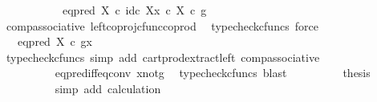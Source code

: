 \begin{isabellebody}
\ \ \ \ \ \ \ \ \ \ {\isacharequal}{\kern0pt}\ {\isacharparenleft}{\kern0pt}eq{\isacharunderscore}{\kern0pt}pred\ X\ {\isasymcirc}\isactrlsub c\ {\isasymlangle}id\isactrlsub c\ X{\isacharcomma}{\kern0pt}x\ {\isasymcirc}\isactrlsub c\ {\isasymbeta}\isactrlbsub X\isactrlesub {\isasymrangle}{\isacharparenright}{\kern0pt}\ {\isasymcirc}\isactrlsub c\ g{\isachardoublequoteclose}\isanewline
\ \ \ \ \ \ \ \ \isamarkupfalse%
\ comp{\isacharunderscore}{\kern0pt}associative{}\ left{\isacharunderscore}{\kern0pt}coproj{\isacharunderscore}{\kern0pt}cfunc{\isacharunderscore}{\kern0pt}coprod\ \isamarkupfalse%
\ {\isacharparenleft}{\kern0pt}typecheck{\isacharunderscore}{\kern0pt}cfuncs{\isacharcomma}{\kern0pt}\ force{\isacharparenright}{\kern0pt}\isanewline
\ \ \ \ \ \ \isamarkupfalse%
\ \isamarkupfalse%
\ {\isachardoublequoteopen}{\isachardot}{\kern0pt}{\isachardot}{\kern0pt}{\isachardot}{\kern0pt}\ {\isacharequal}{\kern0pt}\ eq{\isacharunderscore}{\kern0pt}pred\ X\ {\isasymcirc}\isactrlsub c\ {\isasymlangle}g{\isacharcomma}{\kern0pt}x{\isasymrangle}{\isachardoublequoteclose}\isanewline
\ \ \ \ \ \ \ \ \isamarkupfalse%
\ {\isacharparenleft}{\kern0pt}typecheck{\isacharunderscore}{\kern0pt}cfuncs{\isacharcomma}{\kern0pt}\ simp\ add{\isacharcolon}{\kern0pt}\ cart{\isacharunderscore}{\kern0pt}prod{\isacharunderscore}{\kern0pt}extract{\isacharunderscore}{\kern0pt}left\ comp{\isacharunderscore}{\kern0pt}associative{}{\isacharparenright}{\kern0pt}\isanewline
\ \ \ \ \ \ \isamarkupfalse%
\ \isamarkupfalse%
\ {\isachardoublequoteopen}{\isachardot}{\kern0pt}{\isachardot}{\kern0pt}{\isachardot}{\kern0pt}\ {\isacharequal}{\kern0pt}\ {\isasymf}{\isachardoublequoteclose}\isanewline
\ \ \ \ \ \ \ \ \isamarkupfalse%
\ eq{\isacharunderscore}{\kern0pt}pred{\isacharunderscore}{\kern0pt}iff{\isacharunderscore}{\kern0pt}eq{\isacharunderscore}{\kern0pt}conv\ x{\isacharunderscore}{\kern0pt}not{\isacharunderscore}{\kern0pt}g\ \isamarkupfalse%
\ {\isacharparenleft}{\kern0pt}typecheck{\isacharunderscore}{\kern0pt}cfuncs{\isacharcomma}{\kern0pt}\ blast{\isacharparenright}{\kern0pt}\isanewline
\ \ \ \ \ \ \isamarkupfalse%
\ \isamarkupfalse%
\ {\isacharquery}{\kern0pt}thesis\isanewline
\ \ \ \ \ \ \ \ \isamarkupfalse%
\ {\isacharparenleft}{\kern0pt}simp\ add{\isacharcolon}{\kern0pt}\ calculation{\isacharparenright}{\kern0pt}\isanewline
\ \ \ \ \isamarkupfalse%
\isanewline

\end{isabellebody}
